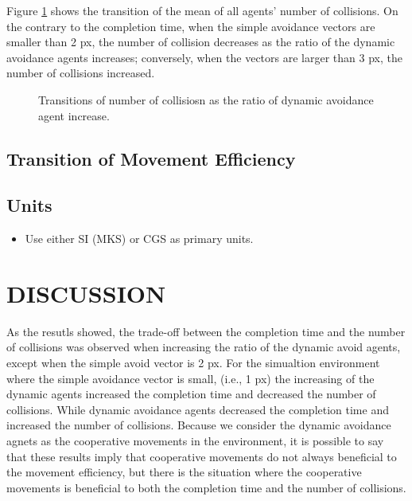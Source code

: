 \documentclass[letterpaper, 10 pt, conference]{ieeeconf}  %
\begin{document}
Figure \ref{fig:result_collisions} shows the transition of the mean of all agents' number of collisions. On the contrary to the completion time, when the simple avoidance vectors are smaller than 2 px, the number of collision decreases as the ratio of the dynamic avoidance agents increases; conversely, when the vectors are larger than 3 px, the number of collisions increased. 

\begin{figure}[thpb]
   \centering
   \caption{Transitions of number of collisiosn as the ratio of dynamic avoidance agent increase.}
   \label{fig:result_collisions}
\end{figure}

\subsection{Transition of Movement Efficiency}

\subsection{Units}

\begin{itemize}
\item Use either SI (MKS) or CGS as primary units. 
\end{itemize}

\section{DISCUSSION}
As the resutls showed, the trade-off between the completion time and the number of collisions was observed when increasing the ratio of the dynamic avoid agents, except when the simple avoid vector is 2 px. For the simualtion environment where the simple avoidance vector is small, (i.e., 1 px) the increasing of the dynamic agents increased the completion time and decreased the number of collisions. While dynamic avoidance agents decreased the completion time and increased the number of collisions. 
Because we consider the dynamic avoidance agnets as the cooperative movements in the environment, it is possible to say that these results imply that cooperative movements do not always beneficial to the movement efficiency, but there is the situation where the cooperative movements is beneficial to both the completion time and the number of collisions.
\end{document}
